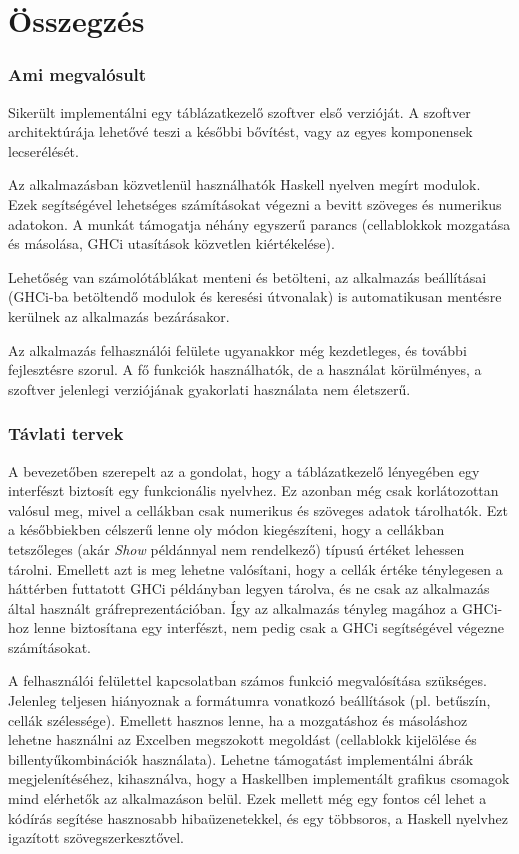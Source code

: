 \chapter{Összegzés} %
\label{ch:sum}

\subsection{Ami megvalósult}

Sikerült implementálni egy táblázatkezelő szoftver első verzióját. A szoftver architektúrája lehetővé teszi a későbbi bővítést, vagy az egyes komponensek lecserélését. 

Az alkalmazásban közvetlenül használhatók Haskell nyelven megírt modulok. Ezek segítségével lehetséges számításokat végezni a bevitt szöveges és numerikus adatokon. A munkát támogatja néhány egyszerű parancs (cellablokkok mozgatása és másolása, GHCi utasítások közvetlen kiértékelése). 

Lehetőség van számolótáblákat menteni és betölteni, az alkalmazás beállításai (GHCi-ba betöltendő modulok és keresési útvonalak) is automatikusan mentésre kerülnek az alkalmazás bezárásakor.

Az alkalmazás felhasználói felülete ugyanakkor még kezdetleges, és további fejlesztésre szorul. A fő funkciók használhatók, de a használat körülményes, a szoftver jelenlegi verziójának gyakorlati használata nem életszerű.

\subsection{Távlati tervek}

A bevezetőben szerepelt az a gondolat, hogy a táblázatkezelő lényegében egy interfészt biztosít egy funkcionális nyelvhez. Ez azonban még csak korlátozottan valósul meg, mivel a cellákban csak numerikus és szöveges adatok tárolhatók. Ezt a későbbiekben célszerű lenne oly módon kiegészíteni, hogy a cellákban tetszőleges (akár \textit{Show} példánnyal nem rendelkező) típusú értéket lehessen tárolni. Emellett azt is meg lehetne valósítani, hogy a cellák értéke ténylegesen a háttérben futtatott GHCi példányban legyen tárolva, és ne csak az alkalmazás által használt gráfreprezentációban. Így az alkalmazás tényleg magához a GHCi-hoz lenne biztosítana egy interfészt, nem pedig csak a GHCi segítségével végezne számításokat.

A felhasználói felülettel kapcsolatban számos funkció megvalósítása szükséges. Jelenleg teljesen hiányoznak a formátumra vonatkozó beállítások (pl. betűszín, cellák szélessége). Emellett hasznos lenne, ha a mozgatáshoz és másoláshoz lehetne használni az Excelben megszokott megoldást (cellablokk kijelölése és billentyűkombinációk használata). Lehetne támogatást implementálni ábrák megjelenítéséhez, kihasználva, hogy a Haskellben implementált grafikus csomagok mind elérhetők az alkalmazáson belül. Ezek mellett még egy fontos cél lehet a kódírás segítése hasznosabb hibaüzenetekkel, és egy többsoros, a Haskell nyelvhez igazított szövegszerkesztővel. 


